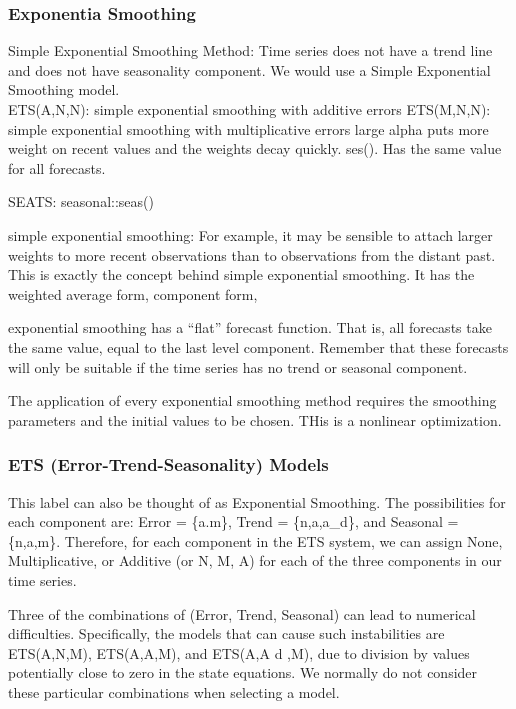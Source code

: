 \documentclass[]{book}
\begin{document}
\hypertarget{exponentia-smoothing}{%
\subsubsection{Exponentia Smoothing}\label{exponentia-smoothing}}

Simple Exponential Smoothing Method: Time series does not have a trend line and does not have seasonality component. We would use a Simple Exponential Smoothing model.\\
ETS(A,N,N): simple exponential smoothing with additive errors \textbar{} ETS(M,N,N): simple exponential smoothing with multiplicative errors large alpha puts more weight on recent values and the weights decay quickly. ses(). Has the same value for all forecasts.

SEATS: seasonal::seas()

simple exponential smoothing: For example, it may be sensible to attach larger weights to more recent observations than to observations from the distant past. This is exactly the concept behind simple exponential smoothing. It has the weighted average form, component form,

exponential smoothing has a ``flat'' forecast function. That is, all forecasts take the same value, equal to the last level component. Remember that these forecasts will only be suitable if the time series has no trend or seasonal component.

The application of every exponential smoothing method requires the smoothing parameters and the initial values to be chosen. THis is a nonlinear optimization.

\hypertarget{ets-error-trend-seasonality-models}{%
\subsubsection{ETS (Error-Trend-Seasonality) Models}\label{ets-error-trend-seasonality-models}}

This label can also be thought of as Exponential Smoothing. The possibilities for each component are: Error = \{a.m\}, Trend = \{n,a,a\_d\}, and Seasonal = \{n,a,m\}. Therefore, for each component in the ETS system, we can assign None, Multiplicative, or Additive (or N, M, A) for each of the three components in our time series.

Three of the combinations of (Error, Trend, Seasonal) can lead to numerical difficulties. Specifically, the models that can cause such instabilities are ETS(A,N,M), ETS(A,A,M), and ETS(A,A d ,M), due to division by values potentially close to zero in the state equations. We normally do not consider these particular combinations when selecting a model.
\end{document}
